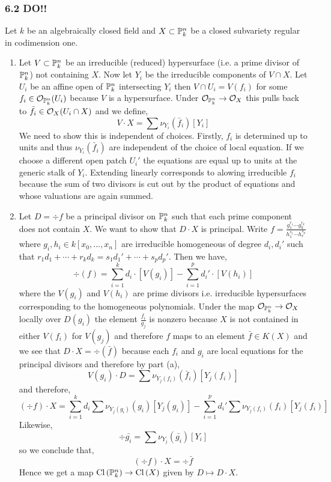 \documentclass[12pt]{article}
\begin{document}
\subsubsection{6.2 DO!!}

Let $k$ be an algebraically closed field and $X \subset \P^n_k$ be a closed subvariety regular in codimension one.

\begin{enumerate}
\item Let $V \subset \P^n_k$ be an irreducible (reduced) hypersurface (i.e. a prime divisor of $\P^n_k$) not containing $X$. Now let $Y_i$ be the irreducible components of $V \cap X$. Let $U_i$ be an affine open of $\P^n_k$ intersecting $Y_i$ then $V \cap U_i = V(f_i)$ for some $f_i \in \struct{\P^n_k}(U_i)$ because $V$ is a hypersurface. Under $\struct{\P^n_k} \to \struct{X}$ this pulls back to $\bar{f}_i \in \struct{X}(U_i \cap X)$ and we define,
\[ V \cdot X = \sum \nu_{Y_i}(\bar{f}_i) [Y_i] \]
We need to show this is independent of choices. Firstly, $f_i$ is determined up to units and thus $\nu_{Y_i}(\bar{f}_i)$ are independent of the choice of local equation. If we choose a different open patch $U_i'$ the equations are equal up to units at the generic stalk of $Y_i$. Extending linearly corresponds to alowing irreducible $f_i$ because the sum of two divisors is cut out by the product of equations and whose valuations are again summed.

\item Let $D = \div{f}$ be a principal divisor on $\P^n_k$ such that each prime component does not contain $X$. We want to show that $D \cdot X$ is principal. Write $f = \frac{g_1^{r_1} \cdots g_k^{r_k}}{h_1^{s_1} \cdots h_r^{s_p}}$ where $g_i,h_i \in k[x_0, \dots, x_n]$ are irreducible homogeneous of degree $d_i, d_i'$ such that $r_1 d_1 + \cdots + r_k d_k = s_1 d_1' + \cdots + s_p d_p'$. Then we have,
\[ \div{(f)} = \sum_{i = 1}^k d_i \cdot [V(g_i)] - \sum_{i = 1}^p d_i' \cdot [V(h_i)] \]
where the $V(g_i)$ and $V(h_i)$ are prime divisors i.e. irreducible hypersurfaces corresponding to the homogeneous polynomials. Under the map $\struct{\P^n_k} \to \struct{X}$ locally over $D(g_i)$ the element $\frac{f_i}{g_j}$ is nonzero because $X$ is not contained in either $V(f_i)$ for $V(g_j)$ and therefore $f$ maps to an element $\bar{f} \in K(X)$ and we see that $D \cdot X = \div{(\bar{f})}$ because each $f_i$ and $g_i$ are local equations for the principal divisors and therefore by part (a),
\[ V(g_i) \cdot D = \sum \nu_{Y_j(f_i)}(\bar{f}_i) [Y_j(f_i)] \]
and therefore, 
\[ (\div{f}) \cdot X = \sum_{i = 1}^k d_i \sum \nu_{Y_j(g_i)}(g_i) [Y_j(g_i)]  - \sum_{i = 1}^p d_i' \sum \nu_{Y_j(f_i)}(f_i) [Y_j(f_i)] \]
Likewise,
\[ \div{\bar{g_i}} = \sum \nu_{Y_j}(\bar{g_i}) [Y_i]  \]
so we conclude that,
\[ (\div{f}) \cdot X = \div{\bar{f}} \]
Hence we get a map $\Cl{\P^n_k} \to \Cl{X}$ given by $D \mapsto D \cdot X$. 


\end{enumerate}
\end{document}
